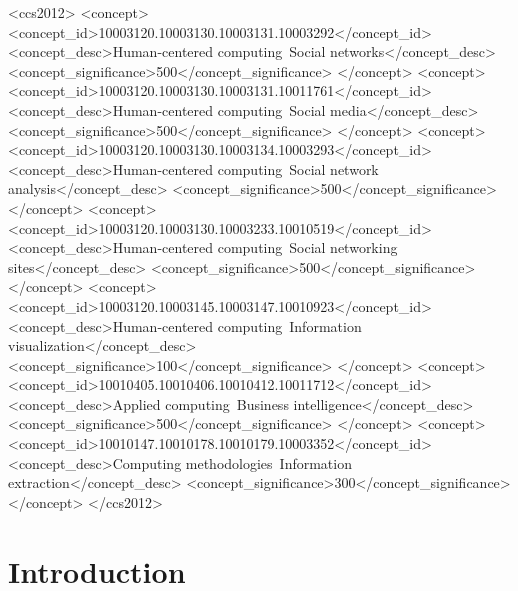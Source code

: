 \documentclass[sigconf]{acmart}
\begin{document}
\begin{CCSXML}
<ccs2012>
<concept>
<concept_id>10003120.10003130.10003131.10003292</concept_id>
<concept_desc>Human-centered computing~Social networks</concept_desc>
<concept_significance>500</concept_significance>
</concept>
<concept>
<concept_id>10003120.10003130.10003131.10011761</concept_id>
<concept_desc>Human-centered computing~Social media</concept_desc>
<concept_significance>500</concept_significance>
</concept>
<concept>
<concept_id>10003120.10003130.10003134.10003293</concept_id>
<concept_desc>Human-centered computing~Social network analysis</concept_desc>
<concept_significance>500</concept_significance>
</concept>
<concept>
<concept_id>10003120.10003130.10003233.10010519</concept_id>
<concept_desc>Human-centered computing~Social networking sites</concept_desc>
<concept_significance>500</concept_significance>
</concept>
<concept>
<concept_id>10003120.10003145.10003147.10010923</concept_id>
<concept_desc>Human-centered computing~Information visualization</concept_desc>
<concept_significance>100</concept_significance>
</concept>
<concept>
<concept_id>10010405.10010406.10010412.10011712</concept_id>
<concept_desc>Applied computing~Business intelligence</concept_desc>
<concept_significance>500</concept_significance>
</concept>
<concept>
<concept_id>10010147.10010178.10010179.10003352</concept_id>
<concept_desc>Computing methodologies~Information extraction</concept_desc>
<concept_significance>300</concept_significance>
</concept>
</ccs2012>
\end{CCSXML}



\maketitle

\section{Introduction}\label{intro}
\end{document}
